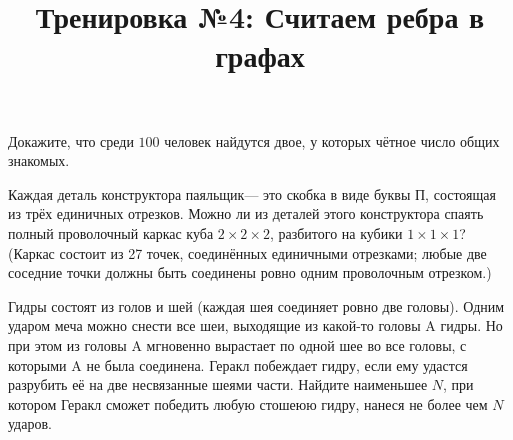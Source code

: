 



\title{Тренировка №4: Считаем ребра в графах}
\maketitle

\begin{problem}
	Докажите, что среди $100$ человек найдутся двое, у которых чётное число общих знакомых.
\end{problem}

\begin{problem}
	Каждая деталь конструктора  паяльщик\guillemotright --- это скобка в виде буквы П, состоящая из трёх единичных отрезков. Можно ли из деталей этого конструктора спаять полный проволочный каркас куба $2 \times 2 \times 2$, разбитого на кубики $1 \times 1 \times 1$? (Каркас состоит из 27 точек, соединённых единичными отрезками; любые две соседние точки должны быть соединены ровно одним проволочным отрезком.)
\end{problem}

\begin{problem}
	Гидры состоят из голов и шей (каждая шея соединяет ровно две головы). Одним ударом меча можно снести все шеи, выходящие из какой-то головы A гидры. Но при этом из головы A мгновенно вырастает по одной шее во все головы, с которыми A не была соединена. Геракл побеждает гидру, если ему удастся разрубить её на две несвязанные шеями части. Найдите наименьшее $N$, при котором Геракл сможет победить любую стошеюю гидру, нанеся не более чем $N$ ударов.
\end{problem}

